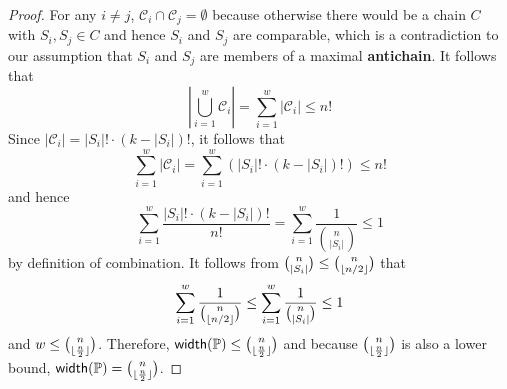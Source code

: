 \begin{proof}
    For any $i \neq j$, $\mathcal{C}_i \cap \mathcal{C}_j = \emptyset$ because otherwise there would be a chain $C$ with $S_i,S_j \in C$ and hence $S_i$ and $S_j$ are comparable, which is a contradiction to our assumption that $S_i$ and $S_j$ are members of a maximal \textbf{antichain}. It follows that
    $$
    \left| \bigcup_{i=1}^w \mathcal{C}_i \right| = \sum_{i=1}^w |\mathcal{C}_i| \leq n!
    $$
    Since $|\mathcal{C}_i| = |S_i|! \cdot (k-|S_i|)!$, it follows that
    $$
    \sum_{i=1}^w |\mathcal{C}_i| = \sum_{i=1}^w (|S_i|! \cdot (k-|S_i|)!) \leq n!
    $$
    and hence
    $$
    \sum_{i=1}^w \frac{|S_i|! \cdot (k-|S_i|)!}{n!} = \sum_{i=1}^w \frac{1}{\binom{n}{|S_i|}} \leq 1
    $$
    by definition of combination. It follows from $\binom{n}{|S_i|} \leq \binom{n}{\lfloor n/2\rfloor}$ that
    $$
    \sum_{i=1}^w \frac{1}{\binom{n}{\lfloor n/2\rfloor}} \leq \sum_{i=1}^w \frac{1}{\binom{n}{|S_i|}}\leq 1
    $$
    and $w \leq \binom{n}{\lfloor\frac{n}{2}\rfloor}$. Therefore, $\mathsf{width}(\mathbb{P}) \leq \binom{n}{\lfloor\frac{n}{2}\rfloor}$ and because $\binom{n}{\lfloor\frac{n}{2}\rfloor}$ is also a lower bound, $\mathsf{width}(\mathbb{P}) = \binom{n}{\lfloor\frac{n}{2}\rfloor}$.
\end{proof}

